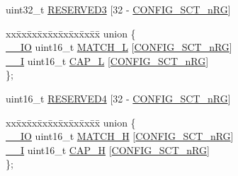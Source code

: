 \begin{DoxyCompactItemize}
\begin{tabbing}
\end{tabbing}\item 
uint32\+\_\+t \hyperlink{struct_l_p_c___s_c_t___t_a8111db9741d80e57b9716c30b4cdf8ca}{R\+E\+S\+E\+R\+V\+E\+D3} \mbox{[}32 -\/ \hyperlink{group___s_c_t__18_x_x__43_x_x_ga8d80e251208a01483a6b00c81ecb7493}{C\+O\+N\+F\+I\+G\+\_\+\+S\+C\+T\+\_\+n\+RG}\mbox{]}
\item 
\begin{tabbing}
xx\=xx\=xx\=xx\=xx\=xx\=xx\=xx\=xx\=\kill
union \{\\
\>\hyperlink{core__sc300_8h_aec43007d9998a0a0e01faede4133d6be}{\_\_IO} uint16\_t \hyperlink{struct_l_p_c___s_c_t___t_a6cfd9ec0616d4ae50f3e37fd09a3833e}{MATCH\_L} \mbox{[}\hyperlink{group___s_c_t__18_x_x__43_x_x_ga8d80e251208a01483a6b00c81ecb7493}{CONFIG\_SCT\_nRG}\mbox{]}\\
\>\hyperlink{core__sc300_8h_af63697ed9952cc71e1225efe205f6cd3}{\_\_I} uint16\_t \hyperlink{struct_l_p_c___s_c_t___t_a2fa99744e0810b96bbe3b0d6732b3f88}{CAP\_L} \mbox{[}\hyperlink{group___s_c_t__18_x_x__43_x_x_ga8d80e251208a01483a6b00c81ecb7493}{CONFIG\_SCT\_nRG}\mbox{]}\\
\}; \\

\end{tabbing}\item 
uint16\+\_\+t \hyperlink{struct_l_p_c___s_c_t___t_a28279158c43862b0bf3a89e7f671880d}{R\+E\+S\+E\+R\+V\+E\+D4} \mbox{[}32 -\/ \hyperlink{group___s_c_t__18_x_x__43_x_x_ga8d80e251208a01483a6b00c81ecb7493}{C\+O\+N\+F\+I\+G\+\_\+\+S\+C\+T\+\_\+n\+RG}\mbox{]}
\item 
\begin{tabbing}
xx\=xx\=xx\=xx\=xx\=xx\=xx\=xx\=xx\=\kill
union \{\\
\>\hyperlink{core__sc300_8h_aec43007d9998a0a0e01faede4133d6be}{\_\_IO} uint16\_t \hyperlink{struct_l_p_c___s_c_t___t_a914bfeb140b6f7de835bd34f7fb68d2c}{MATCH\_H} \mbox{[}\hyperlink{group___s_c_t__18_x_x__43_x_x_ga8d80e251208a01483a6b00c81ecb7493}{CONFIG\_SCT\_nRG}\mbox{]}\\
\>\hyperlink{core__sc300_8h_af63697ed9952cc71e1225efe205f6cd3}{\_\_I} uint16\_t \hyperlink{struct_l_p_c___s_c_t___t_a2f2ca2aa2633599a9aa8dbfdb73cb20b}{CAP\_H} \mbox{[}\hyperlink{group___s_c_t__18_x_x__43_x_x_ga8d80e251208a01483a6b00c81ecb7493}{CONFIG\_SCT\_nRG}\mbox{]}\\
\}; \\


\end{tabbing}
\end{DoxyCompactItemize}
